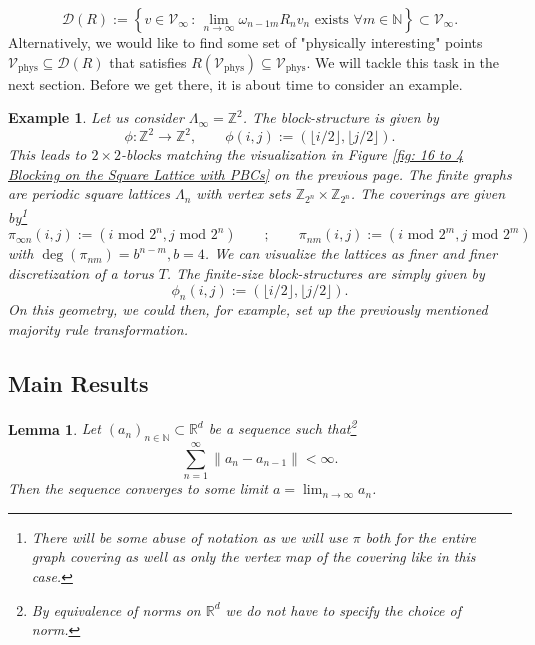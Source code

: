 \documentclass{article}
\newtheorem{lemma}[theorem]{Lemma}
\newtheorem{example}[theorem]{Example}
\begin{document}
\begin{equation}
    \mathscr{D}(R):=\left\{v\in \mathcal{V}_\infty\,:\,\lim_{n\to\infty}\omega_{n-1m}R_nv_n\,\,\mathrm{exists}\,\,\forall m\in\mathds{N}\right\}\subset \mathcal{V}_\infty.
\end{equation}
Alternatively, we would like to find some set of "physically interesting" points $\mathcal{V}_\mathrm{phys}\subseteq\mathscr{D}(R)$ that satisfies $R(\mathcal{V}_\mathrm{phys})\subseteq \mathcal{V}_\mathrm{phys}$. We will tackle this task in the next section. Before we get there, it is about time to consider an example.

\begin{example}
    Let us consider $\Lambda_\infty=\mathds{Z}^2$. The block-structure is given by
    \begin{equation}
        \phi:\mathds{Z}^2\to\mathds{Z}^2,\qquad \phi(i,j):=(\lfloor i/2\rfloor,\lfloor j/2\rfloor).
    \end{equation}
    This leads to $2\times2$-blocks matching the visualization in Figure \ref{fig: 16 to 4 Blocking on the Square Lattice with PBCs} on the previous page. The finite graphs are periodic square lattices $\Lambda_n$ with vertex sets $\mathds{Z}_{2^n}\times\mathds{Z}_{2^n}$. The coverings are given by\footnote{There will be some abuse of notation as we will use $\pi$ both for the entire graph covering as well as only the vertex map of the covering like in this case.}
    \begin{equation}
        \pi_{\infty n}(i,j):=(i\,\,\mathrm{mod}\,\,2^n,j\,\,\mathrm{mod}\,\, 2^n)\qquad;\qquad \pi_{nm}(i,j):=(i\,\,\mathrm{mod}\,\, 2^m,j\,\,\mathrm{mod}\,\,2^m)
    \end{equation}
    with $\deg(\pi_{nm})=b^{n-m},b=4$. We can visualize the lattices as finer and finer discretization of a torus $T$. The finite-size block-structures are simply given by
    \begin{equation}
        \phi_n(i,j):=(\lfloor i/2\rfloor,\lfloor j/2\rfloor).
    \end{equation}
    On this geometry, we could then, for example, set up the previously mentioned majority rule transformation.
\end{example}

\subsection{Main Results}

\begin{lemma}\label{Lem1}
    Let $(a_n)_{n\in\mathds{N}}\subset\mathds{R}^d$ be a sequence such that\footnote{By equivalence of norms on $\mathds{R}^d$ we do not have to specify the choice of norm.}
    \begin{equation}
        \sum_{n=1}^\infty\|a_n-a_{n-1}\|<\infty.
    \end{equation}
    Then the sequence converges to some limit $a=\lim_{n\to\infty}a_n$.
\end{lemma}
\end{document}
